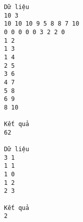 \begin{verbatim}
Dữ liệu
10 3
10 10 10 9 5 8 8 7 10
0 0 0 0 0 3 2 2 0
1 2
1 3
1 4
2 5
3 6
4 7
5 8
6 9
8 10

Kết quả
62

Dữ liệu
3 1
1 1
1 0
1 2
2 3

Kết quả
2
\end{verbatim}